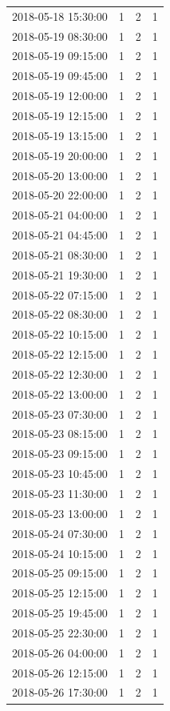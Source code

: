 \begin{tabular}{lrrr}
2018-05-18 15:30:00 & 1 & 2 & 1 \\
2018-05-19 08:30:00 & 1 & 2 & 1 \\
2018-05-19 09:15:00 & 1 & 2 & 1 \\
2018-05-19 09:45:00 & 1 & 2 & 1 \\
2018-05-19 12:00:00 & 1 & 2 & 1 \\
2018-05-19 12:15:00 & 1 & 2 & 1 \\
2018-05-19 13:15:00 & 1 & 2 & 1 \\
2018-05-19 20:00:00 & 1 & 2 & 1 \\
2018-05-20 13:00:00 & 1 & 2 & 1 \\
2018-05-20 22:00:00 & 1 & 2 & 1 \\
2018-05-21 04:00:00 & 1 & 2 & 1 \\
2018-05-21 04:45:00 & 1 & 2 & 1 \\
2018-05-21 08:30:00 & 1 & 2 & 1 \\
2018-05-21 19:30:00 & 1 & 2 & 1 \\
2018-05-22 07:15:00 & 1 & 2 & 1 \\
2018-05-22 08:30:00 & 1 & 2 & 1 \\
2018-05-22 10:15:00 & 1 & 2 & 1 \\
2018-05-22 12:15:00 & 1 & 2 & 1 \\
2018-05-22 12:30:00 & 1 & 2 & 1 \\
2018-05-22 13:00:00 & 1 & 2 & 1 \\
2018-05-23 07:30:00 & 1 & 2 & 1 \\
2018-05-23 08:15:00 & 1 & 2 & 1 \\
2018-05-23 09:15:00 & 1 & 2 & 1 \\
2018-05-23 10:45:00 & 1 & 2 & 1 \\
2018-05-23 11:30:00 & 1 & 2 & 1 \\
2018-05-23 13:00:00 & 1 & 2 & 1 \\
2018-05-24 07:30:00 & 1 & 2 & 1 \\
2018-05-24 10:15:00 & 1 & 2 & 1 \\
2018-05-25 09:15:00 & 1 & 2 & 1 \\
2018-05-25 12:15:00 & 1 & 2 & 1 \\
2018-05-25 19:45:00 & 1 & 2 & 1 \\
2018-05-25 22:30:00 & 1 & 2 & 1 \\
2018-05-26 04:00:00 & 1 & 2 & 1 \\
2018-05-26 12:15:00 & 1 & 2 & 1 \\
2018-05-26 17:30:00 & 1 & 2 & 1 \\

\end{tabular}
